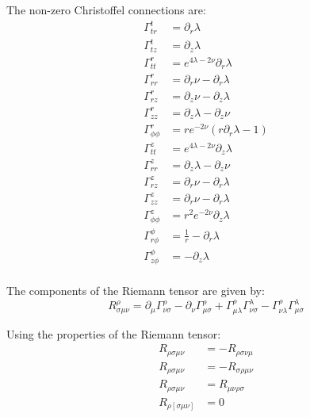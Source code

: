 \documentclass{article}
\begin{document}
The non-zero Christoffel connections are:
\begin{equation}
\begin{aligned}
\Gamma^{t}_{tr}&=\partial_{r}\lambda\\
\Gamma^{t}_{tz}&=\partial_{z}\lambda\\
\Gamma^{r}_{tt}&=e^{4\lambda-2\nu}\partial_{r}\lambda\\
\Gamma^{r}_{rr}&=\partial_{r}\nu-\partial_{r}\lambda\\
\Gamma^{r}_{rz}&=\partial_{z}\nu-\partial_{z}\lambda\\
\Gamma^{r}_{zz}&=\partial_{z}\lambda-\partial_{z}\nu\\
\Gamma^{r}_{\phi\phi}&=re^{-2\nu}\left(r\partial_{r}\lambda-1\right)\\
\Gamma^{z}_{tt}&=e^{4\lambda-2\nu}\partial_{z}\lambda\\
\Gamma^{z}_{rr}&=\partial_{z}\lambda-\partial_{z}\nu\\
\Gamma^{z}_{rz}&=\partial_{r}\nu-\partial_{r}\lambda\\ 
\Gamma^{z}_{zz}&=\partial_{r}\nu-\partial_{r}\lambda\\
\Gamma^{z}_{\phi\phi}&=r^{2}e^{-2\nu}\partial_{z}\lambda\\
\Gamma^{\phi}_{r\phi}&=\frac{1}{r}-\partial_{r}\lambda\\
\Gamma^{\phi}_{z\phi}&=-\partial_{z}\lambda\\
\end{aligned}
\label{eq:christoffel-connections}
\end{equation}

The components of the Riemann tensor are given by:
\begin{equation}
R_{\sigma\mu\nu}^{\rho}=\partial_{\mu}\Gamma_{\nu\sigma}^{\rho}-\partial_{\nu}\Gamma_{\mu\sigma}^{\rho}+\Gamma_{\mu\lambda}^{\rho}\Gamma_{\nu\sigma}^{\lambda}-\Gamma_{\nu\lambda}^{\rho}\Gamma_{\mu\sigma}^{\lambda}
\end{equation}

Using the properties of the Riemann tensor:
\begin{equation}
\begin{aligned}
R_{\rho\sigma\mu\nu}&=-R_{\rho\sigma\nu\mu}\\
R_{\rho\sigma\mu\nu}&=-R_{\sigma\rho\mu\nu}\\
R_{\rho\sigma\mu\nu}&=R_{\mu\nu\rho\sigma}\\
R_{\rho[\sigma\mu\nu]}&=0\\
\end{aligned}
\end{equation}
\end{document}
